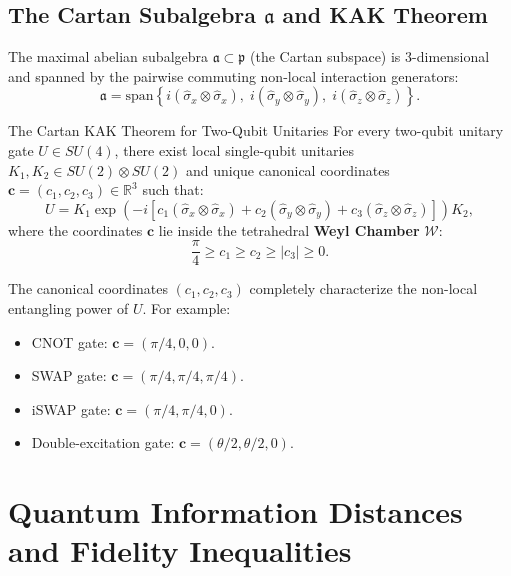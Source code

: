 \subsection{The Cartan Subalgebra $\mathfrak{a}$ and KAK Theorem}
The maximal abelian subalgebra $\mathfrak{a} \subset \mathfrak{p}$ (the Cartan subspace) is 3-dimensional and spanned by the pairwise commuting non-local interaction generators:
\begin{equation}
    \mathfrak{a} = \text{span}\left\{ i (\hat{\sigma}_x \otimes \hat{\sigma}_x), \; i (\hat{\sigma}_y \otimes \hat{\sigma}_y), \; i (\hat{\sigma}_z \otimes \hat{\sigma}_z) \right\}.
\end{equation}

\begin{theorembox}{The Cartan KAK Theorem for Two-Qubit Unitaries}
For every two-qubit unitary gate $U \in SU(4)$, there exist local single-qubit unitaries $K_1, K_2 \in SU(2) \otimes SU(2)$ and unique canonical coordinates $\bm{c} = (c_1, c_2, c_3) \in \mathbb{R}^3$ such that:
\begin{equation}
    U = K_1 \exp\left( -i \left[ c_1 (\hat{\sigma}_x \otimes \hat{\sigma}_x) + c_2 (\hat{\sigma}_y \otimes \hat{\sigma}_y) + c_3 (\hat{\sigma}_z \otimes \hat{\sigma}_z) \right] \right) K_2,
    \label{eq:kak_theorem_canonical_form}
\end{equation}
where the coordinates $\bm{c}$ lie inside the tetrahedral \textbf{Weyl Chamber} $\mathcal{W}$:
\begin{equation}
    \frac{\pi}{4} \ge c_1 \ge c_2 \ge |c_3| \ge 0.
\end{equation}
\end{theorembox}

The canonical coordinates $(c_1, c_2, c_3)$ completely characterize the non-local entangling power of $U$. For example:
\begin{itemize}
    \item CNOT gate: $\bm{c} = (\pi/4, 0, 0)$.
    \item SWAP gate: $\bm{c} = (\pi/4, \pi/4, \pi/4)$.
    \item iSWAP gate: $\bm{c} = (\pi/4, \pi/4, 0)$.
    \item Double-excitation gate: $\bm{c} = (\theta/2, \theta/2, 0)$.
\end{itemize}

\section{Quantum Information Distances and Fidelity Inequalities}
\label{sec:app_fidelity_bounds}

